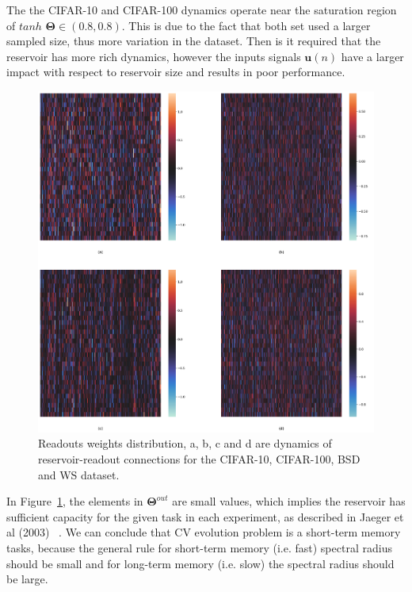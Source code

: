 \documentclass{WitsPhysicsReport}
\begin{document}
The the CIFAR-10 and CIFAR-100 dynamics operate near the saturation region of $tanh$  ${\mathbf{\Theta}} \in(0.8, 0.8)$. This is due to the fact that both set used a larger sampled size, thus more variation in the dataset. Then is it required that the reservoir has more rich dynamics, however the inputs signals $\mathbf{u}(n)$ have a larger impact with respect to reservoir size and results in poor performance.

\begin{figure}[H]
\centering
  \includegraphics[width=1\textwidth]{Figure/Results/Reservoir_activity_Readout_weights_activity_.png}
 \caption{Readouts weights distribution, a, b, c and d are dynamics of reservoir-readout connections for the CIFAR-10, CIFAR-100, BSD and WS dataset.}
 \label{fig:readout_activity}
\end{figure}


In Figure~\ref{fig:readout_activity}, the elements in ${\mathbf{\Theta}}^{out}$ are small values, which implies the reservoir has sufficient capacity for the given task in each experiment, as described in Jaeger et al (2003) ~\citep{jaeger2002tutorial}. We can conclude that CV evolution problem is a short-term memory  tasks, because the general rule for short-term memory (i.e. fast) spectral radius should be small and for long-term memory (i.e. slow) the spectral radius should be large. 
\end{document}

